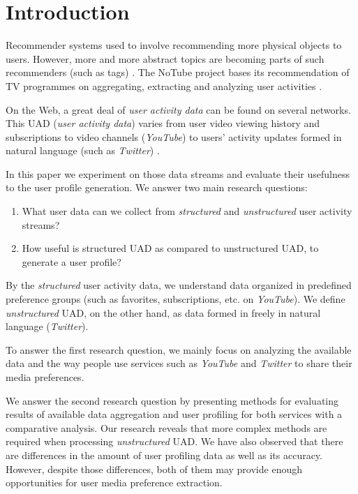 \section{Introduction}

Recommender systems used to involve recommending more physical objects \cite{combining-cf-with-pa} to users.
However, more and more abstract topics are becoming parts of such recommenders (such as tags) \cite{accuracy-recommending}. The NoTube project bases its recommendation of TV programmes on aggregating,
extracting and analyzing user activities \cite{notube-main}.

On the Web, a great deal of \textit{user activity data} can be found on several networks. This UAD (\textit{user activity data}) varies from user video viewing history and subscriptions to video channels (\eg \textit{YouTube}) to users' activity updates formed in natural language (such as \textit{Twitter}) \cite{why-we-twitter}.

In this paper we experiment on those data streams and evaluate their usefulness to the user profile generation. We answer
two main research questions:
\begin{enumerate}
  \item What user data can we collect from \textit{structured} and \textit{unstructured} user activity streams?
  \item How useful is structured UAD as compared to unstructured UAD, to generate a user profile?
\end{enumerate}

By the \textit{structured} user activity data, we understand data organized in predefined
preference groups (such as favorites, subscriptions, etc. on \textit{YouTube}).
We define \textit{unstructured} UAD, on the other hand, as data formed in freely in
natural language (\textit{Twitter}).

To answer the first research question, we mainly focus on analyzing the available
data and the way people use services such as \textit{YouTube} and \textit{Twitter} to share
their media preferences.

We answer the second research question by presenting methods for evaluating results of
available data aggregation and user profiling for both services with a comparative analysis.
Our research reveals that more complex methods are required when processing \textit{unstructured} UAD.
We have also observed that there are differences in the amount of user profiling data as well as its
accuracy. However, despite those differences, both of them may provide
enough opportunities for user media preference extraction.

